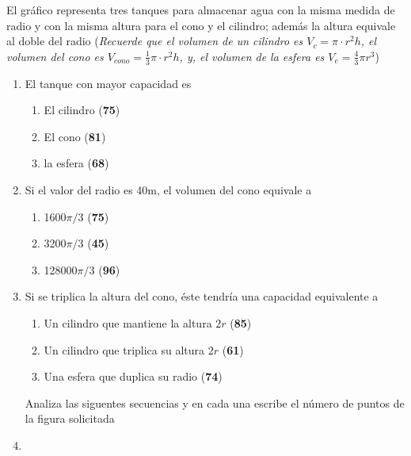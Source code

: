 \documentclass[letterpaper,twoside]{article}
\begin{document}
\begin{multicols}{2}
\begin{center}
\end{center}
El gráfico representa tres tanques para almacenar agua con la misma medida de radio y con la misma altura para el cono y el cilindro; además la altura equivale al doble del radio (\emph{Recuerde que el volumen de un cilindro es $V_{c}=\pi\cdot r^{2}h$, el volumen del cono es $V_{cono}=\frac{1}{3}\pi\cdot r^{2}h$, y, el volumen de la esfera es $V_{e}=\frac{4}{3}\pi r^{3}$})
\begin{enumerate}
\item El tanque con mayor capacidad es
\begin{enumerate}
\item El cilindro (\textbf{75})
\item El cono (\textbf{81})
\item la esfera (\textbf{68})
\end{enumerate}
\item Si el valor del radio es 40m, el volumen del cono equivale a
\begin{enumerate}
\item 1600$\pi/3$ (\textbf{75})
\item 3200$\pi/3$ (\textbf{45})
\item 128000$\pi/3$ (\textbf{96})
\end{enumerate}
\item Si se triplica la altura del cono, éste tendría una capacidad equivalente a
\begin{enumerate}
\item Un cilindro que mantiene la altura $2r$ (\textbf{85})
\item Un cilindro que triplica su altura $2r$ (\textbf{61})
\item Una esfera que duplica su radio (\textbf{74})
\end{enumerate}
Analiza las siguentes secuencias y en cada una escribe el número de puntos de la figura solicitada
\item 
{}
\end{enumerate}
\end{multicols}
\end{document}

